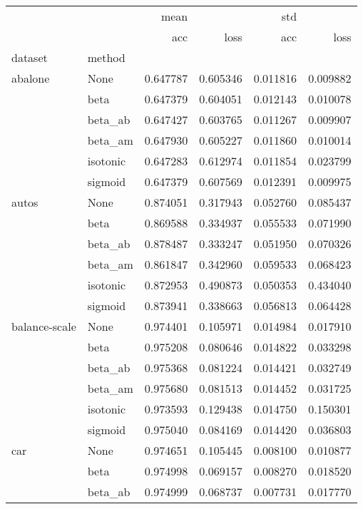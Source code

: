 \begin{tabular}{llrrrr}
\toprule
        &      &      mean &           &       std &           \\
        &      &       acc &      loss &       acc &      loss \\
dataset & method &           &           &           &           \\
\midrule
abalone & None &  0.647787 &  0.605346 &  0.011816 &  0.009882 \\
        & beta &  0.647379 &  0.604051 &  0.012143 &  0.010078 \\
        & beta\_ab &  0.647427 &  0.603765 &  0.011267 &  0.009907 \\
        & beta\_am &  0.647930 &  0.605227 &  0.011860 &  0.010014 \\
        & isotonic &  0.647283 &  0.612974 &  0.011854 &  0.023799 \\
        & sigmoid &  0.647379 &  0.607569 &  0.012391 &  0.009975 \\
autos & None &  0.874051 &  0.317943 &  0.052760 &  0.085437 \\
        & beta &  0.869588 &  0.334937 &  0.055533 &  0.071990 \\
        & beta\_ab &  0.878487 &  0.333247 &  0.051950 &  0.070326 \\
        & beta\_am &  0.861847 &  0.342960 &  0.059533 &  0.068423 \\
        & isotonic &  0.872953 &  0.490873 &  0.050353 &  0.434040 \\
        & sigmoid &  0.873941 &  0.338663 &  0.056813 &  0.064428 \\
balance-scale & None &  0.974401 &  0.105971 &  0.014984 &  0.017910 \\
        & beta &  0.975208 &  0.080646 &  0.014822 &  0.033298 \\
        & beta\_ab &  0.975368 &  0.081224 &  0.014421 &  0.032749 \\
        & beta\_am &  0.975680 &  0.081513 &  0.014452 &  0.031725 \\
        & isotonic &  0.973593 &  0.129438 &  0.014750 &  0.150301 \\
        & sigmoid &  0.975040 &  0.084169 &  0.014420 &  0.036803 \\
car & None &  0.974651 &  0.105445 &  0.008100 &  0.010877 \\
        & beta &  0.974998 &  0.069157 &  0.008270 &  0.018520 \\
        & beta\_ab &  0.974999 &  0.068737 &  0.007731 &  0.017770 \\

\end{tabular}

